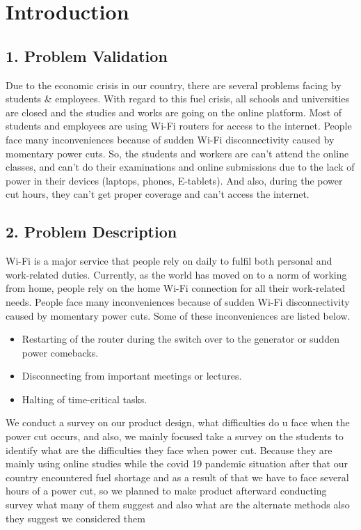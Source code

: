 \documentclass[twocolumn]{article}
\begin{document}
\section*{Introduction}
    \subsection*{1. Problem Validation}
    Due to the economic crisis in our country, there are several problems facing by students \& employees. With regard to this fuel crisis, all schools and universities are closed and the studies and works are going on the online platform. Most of students and employees are using Wi-Fi routers for access to the internet. People face many inconveniences because of sudden Wi-Fi disconnectivity caused by momentary power cuts. So, the students and workers are can’t attend the online classes, and can’t do their examinations and online submissions due to the lack of power in their devices (laptops, phones, E-tablets). And also, during the power cut hours, they can’t get proper coverage and can’t access the internet.
    
    \subsection*{2. Problem Description}
    Wi-Fi is a major service that people rely on daily to fulfil both personal and work-related duties. Currently, as the world has moved on to a norm of working from home, people rely on the home Wi-Fi connection for all their work-related needs. People face many inconveniences because of sudden Wi-Fi disconnectivity caused by momentary power cuts. Some of these inconveniences are listed below.
    
    \begin{itemize}
        \item Restarting of the router during the switch over to the generator or sudden power comebacks. 
        \item Disconnecting from important meetings or lectures. 
        \item Halting of time-critical tasks.
    \end{itemize}

    \noindent We conduct a survey on our product design, what 
    difficulties do u face when the power cut occurs, and 
    also, we mainly focused take a survey on the students 
    to identify what are the difficulties they face when 
    power cut. Because they are mainly using online 
    studies while the covid 19 pandemic situation after that 
    our country encountered fuel shortage and as a result 
    of that we have to face several hours of a power cut, so 
    we planned to make product afterward conducting 
    survey what many of them suggest and also what are 
    the alternate methods also they suggest we considered 
    them
\end{document}
